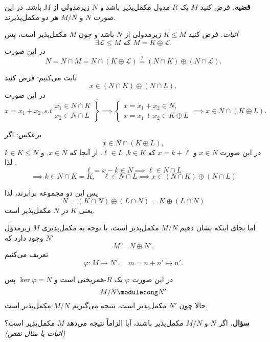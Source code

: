 \section{}



\textbf{قضیه.} فرض کنید \( M \) یک \( R \)-مدول مکمل‌پذیر باشد و \( N \) زیرمدولی از \( M \) باشد. در این صورت \( N \) و \( M/N \) هر دو مکمل‌پذیرند.

\textit{اثبات.} فرض کنید \( K \leq M \) زیرمدولی از \( N \) باشد و چون \( M \) مکمل‌پذیر است، پس
\[
    \exists \mathcal{L} \leq M \text{ که } M = K \oplus \mathcal{L} .
\]
در این صورت
\[
    N = N \cap M = N \cap (K \oplus \mathcal{L} ) \mathrel{\overset{{{?}}}{=}} (N \cap K) \oplus (N \cap \mathcal{L} ).
\]


ثابت  می‌کنیم:
فرض کنید
\[
    x \in (N \cap K) \oplus (N \cap L),
\]
در این صورت
\[
    x = x_1 + x_2, s.t
    \left.
    \begin{aligned}
        x_1 \in N \cap K \\
        x_2 \in N \cap L
    \end{aligned}
    \right\}
    \implies
    \begin{cases}
        x = x_1 + x_2 \in N, \\
        x = x_1 + x_2 \in K \oplus L
    \end{cases}
    \implies x \in N \cap (K \oplus L).
\]

برعکس: اگر
\[
    x \in N \cap (K \oplus L),
\]
در این صورت \( x \in N \) و \( x = k + \ell \) که \( k \in K \), \( \ell \in L \).
از آنجا که \( x \in N \), و \( k \in K \leqslant N\), لذا
\[
    \ell = x - k \in N \implies \ell \in N \cap L
\]
\[
    \implies k \in N \cap K = K, \quad \ell \in N \cap L \implies x \in (N \cap K) \oplus (N \cap L)
\]

پس این دو مجموعه برابرند، لذا
\[
    N = (K \cap N) \oplus (L \cap N) =  K \oplus (L \cap N)
\]
یعنی
\( K \)
در
\( N \)
مکمل‌پذیر است.

اما  بجای اینکه نشان دهیم \( M/N \) مکمل‌پذیر است، با توجه به مکمل‌پذیری \( M \) زیرمدول \( N' \) وجود دارد که
\[
    M = N \oplus N'.
\]
تعریف می‌کنیم
\[
    \varphi : M \to N', \quad m = n + n' \longmapsto n'.
\]

در این صورت \( \varphi \) یک \( R \)-همریختی است و \( \ker \varphi = N \) پس
\[
    M/N \modulecong N'
\]
حالا چون \( N' \) مکمل‌پذیر است، نتیجه می‌گیریم \( M/N \) مکمل‌پذیر است.

\hrulefill

\textbf{سؤال.} اگر \( N \) و \( M/N \) مکمل‌پذیر باشند، آیا الزاماً نتیجه می‌دهد \( M \) مکمل‌پذیر است؟
\textit{(اثبات یا مثال نقض)}

